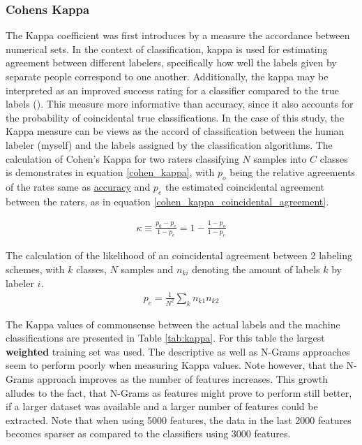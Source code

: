 		\subsubsection{Cohens Kappa}
			The Kappa coefficient was first introduces by \cite{cohen1960coefficient} a measure the accordance between numerical sets. In the context of classification, kappa is used for estimating agreement between different labelers, specifically how well the labels given by separate people correspond to one another. Additionally, the kappa may be interpreted as an improved success rating for a classifier compared to the true labels (\cite{castillo2011information}). This measure more informative than accuracy, since it also accounts for the probability of coincidental true classifications. In the case of this study, the Kappa measure can be views as the accord of classification between the human labeler (myself) and the labels assigned by the classification algorithms. The calculation of Cohen's Kappa for two raters classifying $ N $ samples into $ C $ classes is demonstrates in equation \ref{cohen_kappa}, with $ p_o $ being the relative agreements of the rates same as \hyperref[accuracy]{accuracy} and $ p_e $ the estimated coincidental agreement between the raters, as in equation \ref{cohen_kappa_coincidental_agreement}. 
			
			\begin{equation}
				\begin{aligned}
					\kappa \equiv \frac{p_0-p_e}{1-p_e} = 1 - \frac{1-p_o}{1-p_e}
				\end{aligned}
				\label{cohen_kappa}
			\end{equation}
		
		The calculation of the likelihood of an coincidental agreement between 2 labeling schemes, with $ k $ classes, $ N $ samples and $ n_{ki} $ denoting the amount of labels $ k $ by labeler $ i $.
			\begin{equation}
				\begin{aligned}
					p_e = \frac{1}{N^2}\sum_k n_{k1}n_{k2}
				\end{aligned}
				\label{cohen_kappa_coincidental_agreement}
			\end{equation}
			
		The Kappa values of commonsense between the actual labels and the machine classifications are presented in Table \ref{tab:kappa}. For this table the largest \textbf{weighted} training set was used. The descriptive as well as N-Grams approaches seem to perform poorly when measuring Kappa values. Note however, that the N-Grams approach improves as the number of features increases. This growth alludes to the fact, that N-Grams as features might prove to perform still better, if a larger dataset was available and a larger number of features could be extracted. Note that when using 5000 features, the data in the last 2000 features becomes sparser as compared to the classifiers using 3000 features.
		
